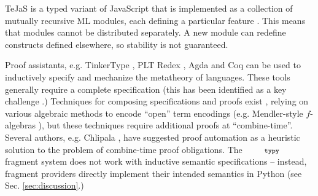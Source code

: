 \documentclass[10pt]{sigplanconf}
\newcommand{\typy}{\texttt{\footnotesize typy}}
\begin{document}
TeJaS is a typed variant of JavaScript that is implemented as a collection of mutually recursive ML modules, each defining a particular feature \cite{DBLP:conf/dls/LernerPGK13}. This means that modules cannot be distributed separately. A new module can redefine constructs defined elsewhere, so stability is not guaranteed.



Proof assistants, e.g. TinkerType \cite{LevinPierce99}, PLT Redex \cite{Felleisen-Findler-Flatt09}, Agda \cite{norell2007towards} and Coq \cite{Coq:manual} can be used to inductively specify and mechanize the metatheory of languages. These tools generally require a complete specification (this  has been identified as a key challenge \cite{aydemir05tphols}.) Techniques for composing specifications and proofs exist \cite{conf/popl/DelawareOS13,Delaware11,conf/plpv/SchwaabS13}, relying on various algebraic methods to encode ``open'' term encodings (e.g. Mendler-style $f$-algebras \cite{conf/popl/DelawareOS13}), but these techniques  require additional proofs at ``combine-time''. %
Several authors, e.g. Chlipala  \cite{Chlipala10}, have suggested  proof automation as a heuristic solution to the problem of combine-time proof obligations. 
The $\typy$ fragment system does not work with inductive semantic specifications -- instead, fragment providers directly implement their intended semantics in Python (see Sec. \ref{sec:discussion}.) 
\end{document}
